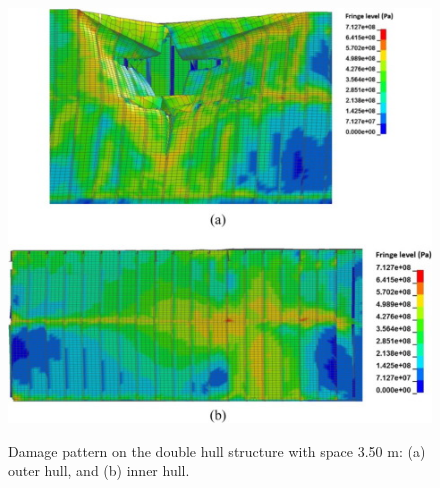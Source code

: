 \documentclass[../Final.tex]{subfiles}
\begin{document}
\begin{figure}[ht]
    \centering
    \includegraphics[width=\columnwidth]{fig8.jpg}
    \label{fig8}
    \caption{Damage pattern on the double hull structure with space 3.50 m: (a) outer hull, and (b) inner hull.}
\end{figure}

\end{document}
